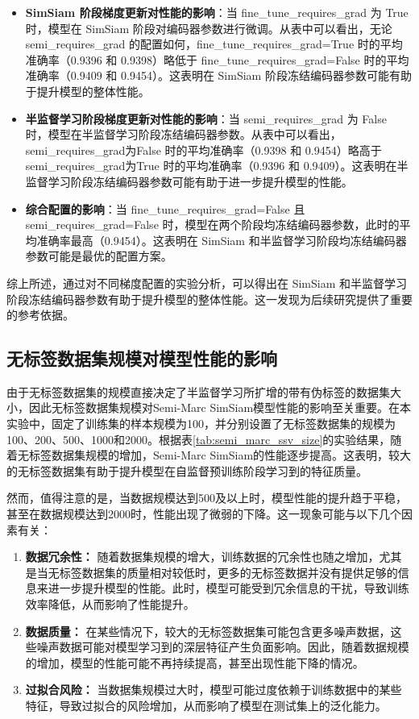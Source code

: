 \documentclass[master]{thesis-uestc}
\begin{document}
\begin{itemize}
    \item \textbf{SimSiam 阶段梯度更新对性能的影响}：当 fine\_tune\_requires\_grad 为 True 时，模型在 SimSiam 阶段对编码器参数进行微调。从表中可以看出，无论 semi\_requires\_grad 的配置如何，fine\_tune\_requires\_grad=True 时的平均准确率（0.9396 和 0.9398）略低于 fine\_tune\_requires\_grad=False 时的平均准确率（0.9409 和 0.9454）。这表明在 SimSiam 阶段冻结编码器参数可能有助于提升模型的整体性能。

    \item \textbf{半监督学习阶段梯度更新对性能的影响}：当 semi\_requires\_grad 为 False 时，模型在半监督学习阶段冻结编码器参数。从表中可以看出，semi\_requires\_grad为False 时的平均准确率（0.9398 和 0.9454）略高于 semi\_requires\_grad为True 时的平均准确率（0.9396 和 0.9409）。这表明在半监督学习阶段冻结编码器参数可能有助于进一步提升模型的性能。

    \item \textbf{综合配置的影响}：当 fine\_tune\_requires\_grad=False 且 semi\_requires\_grad=False 时，模型在两个阶段均冻结编码器参数，此时的平均准确率最高（0.9454）。这表明在 SimSiam 和半监督学习阶段均冻结编码器参数可能是最优的配置方案。
\end{itemize}

综上所述，通过对不同梯度配置的实验分析，可以得出在 SimSiam 和半监督学习阶段冻结编码器参数有助于提升模型的整体性能。这一发现为后续研究提供了重要的参考依据。

\subsection{无标签数据集规模对模型性能的影响}
由于无标签数据集的规模直接决定了半监督学习所扩增的带有伪标签的数据集大小，因此无标签数据集规模对Semi-Marc SimSiam模型性能的影响至关重要。在本实验中，固定了训练集的样本规模为100，并分别设置了无标签数据集的规模为100、200、500、1000和2000。根据表\ref{tab:semi_marc_ssv_size}的实验结果，随着无标签数据集规模的增加，Semi-Marc SimSiam的性能逐步提高。这表明，较大的无标签数据集有助于提升模型在自监督预训练阶段学习到的特征质量。

然而，值得注意的是，当数据规模达到500及以上时，模型性能的提升趋于平稳，甚至在数据规模达到2000时，性能出现了微弱的下降。这一现象可能与以下几个因素有关：

\begin{enumerate}
    \item \textbf{数据冗余性：} 随着数据集规模的增大，训练数据的冗余性也随之增加，尤其是当无标签数据集的质量相对较低时，更多的无标签数据并没有提供足够的信息来进一步提升模型的性能。此时，模型可能受到冗余信息的干扰，导致训练效率降低，从而影响了性能提升。
    \item \textbf{数据质量：} 在某些情况下，较大的无标签数据集可能包含更多噪声数据，这些噪声数据可能对模型学习到的深层特征产生负面影响。因此，随着数据规模的增加，模型的性能可能不再持续提高，甚至出现性能下降的情况。
    \item \textbf{过拟合风险：} 当数据集规模过大时，模型可能过度依赖于训练数据中的某些特征，导致过拟合的风险增加，从而影响了模型在测试集上的泛化能力。
\end{enumerate}
\end{document}
